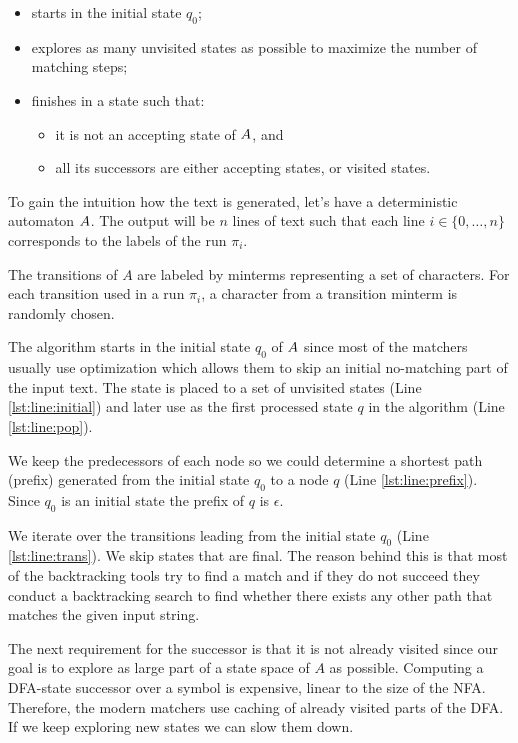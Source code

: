 \documentclass[acmsmall,screen]{acmart}
\begin{document}
\begin{itemize}
 \item starts in the initial state $q_0$;
\item explores as many unvisited states as possible to maximize the number of matching steps;
\item finishes in a state such that:
   \begin{itemize}
     \item it is not an accepting state of $A$, and
	\item all its successors are either accepting states, or visited states.
      \end{itemize}
 \end{itemize}

To gain the intuition how the text is generated, let's have a deterministic automaton $A$. 
%
The output will be $n$ lines of text such that each line $i\in\{0,\dots,n\}$ corresponds to the labels of the run $\pi_i$.
%

%
The transitions of $A$ are labeled by minterms representing a set of characters. 
%
For each transition used in a run $\pi_i$, a character from a transition minterm is randomly chosen.  
%

%
The algorithm starts in the initial state $q_0$ of $A$  since most of the matchers usually use optimization which allows them to skip an initial no-matching part of the input text.
%
The state is placed to a set of unvisited states (Line \ref{lst:line:initial}) and later use as the first processed state $q$ in the algorithm (Line \ref{lst:line:pop}).

We keep the predecessors of each node so we could determine a shortest path (prefix) generated from the initial state $q_0$ to a node $q$ (Line \ref{lst:line:prefix}).
%
Since $q_0$ is an initial state the prefix of $q$ is $\epsilon$.

We iterate over the transitions leading from the initial state $q_0$ (Line \ref{lst:line:trans}).
%
We skip states that are final. 
%
The reason behind this is that most of the backtracking tools try to find a match and if they do not succeed 
%
they conduct a backtracking search to find whether there exists any other path that matches the given input string.

The next requirement for the successor is that it is not already visited since our goal is 
%
to explore as large part of a state space of $A$ as possible.
%
Computing a DFA-state successor over a symbol is expensive, linear to the size of the NFA.
%
Therefore, the modern matchers use caching of already visited parts of the DFA. 
%
If we keep exploring new states we can slow them down.
\end{document}
